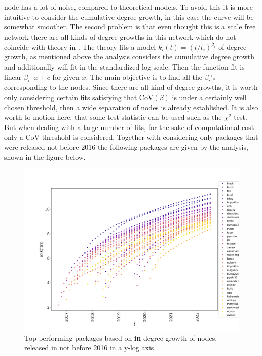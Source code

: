 \documentclass[a4paper]{article}
\begin{document}
node has a lot of noise, compared to theoretical models. To avoid this it is
more intuitive to consider the cumulative degree growth, in this case the
curve will be somewhat smoother. The second problem is that even thought this
is a scale free network there are all kinds of degree growths in this network
which do not coincide with theory in \cite{barabasi}. The theory fits a model $k_i(t) =
\left(t/t_i\right)^{\beta_i}$ of degree growth, as mentioned above
the analysis considers the cumulative degree growth and additionally will fit
in the standardized log scale. Then the function fit is linear $\beta_i \cdot x
+ c$ for given $x$. The main objective is to find all the $\beta_i$'s
corresponding to the nodes. Since there are all kind of degree growths, it is
worth only considering certain fits satisfying that $\text{CoV}(\beta)$ is
under a certainly well chosen threshold, then  a wide separation of nodes is
already established. It is also worth to motion here, that some test
statistic can be used such as the $\chi^2$ test. But when dealing with a
large number of fits, for the sake of computational cost only a $\text{CoV}$
threshold is considered. Together with considering only packages that were
released not before 2016 the following packages are given by the analysis,
shown in the figure below.
\begin{figure}[H]
    \centering
    \includegraphics[width=1\textwidth]{../pres/pics/deg_2016_growth.png}
    \caption{Top performing packages based on \textbf{in}-degree growth of
    nodes, released in not before 2016 in a y-log axis}
    \label{fig:findings}
\end{figure}
\end{document}

